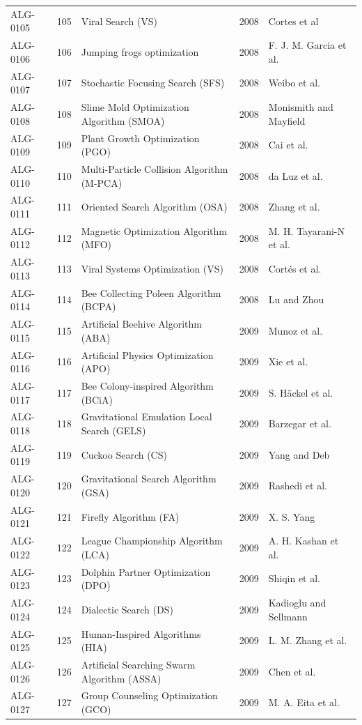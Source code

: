 \documentclass[8pt]{article}
\begin{document}
\begin{landscape}
\begin{longtable}{P{1.7cm}rP{10.0cm}rP{7.2cm}}
ALG-0105 & 105 & Viral Search (VS) & 2008 & Cortes et al \\
ALG-0106 & 106 & Jumping frogs optimization & 2008 & F. J. M. Garcia et al. \\
ALG-0107 & 107 & Stochastic Focusing Search (SFS) & 2008 & Weibo et al. \\
ALG-0108 & 108 & Slime Mold Optimization Algorithm (SMOA) & 2008 & Monismith and Mayfield \\
ALG-0109 & 109 & Plant Growth Optimization (PGO) & 2008 & Cai et al. \\
ALG-0110 & 110 & Multi-Particle Collision Algorithm (M-PCA) & 2008 & da Luz et al. \\
ALG-0111 & 111 & Oriented Search Algorithm (OSA) & 2008 & Zhang et al. \\
ALG-0112 & 112 & Magnetic Optimization Algorithm (MFO) & 2008 & M. H. Tayarani-N et al. \\
ALG-0113 & 113 & Viral Systems Optimization (VS) & 2008 & Cortés et al. \\
ALG-0114 & 114 & Bee Collecting Poleen Algorithm (BCPA) & 2008 & Lu and Zhou \\
ALG-0115 & 115 & Artificial Beehive Algorithm (ABA) & 2009 & Munoz et al. \\
ALG-0116 & 116 & Artificial Physics Optimization (APO) & 2009 & Xie et al. \\
ALG-0117 & 117 & Bee Colony-inspired Algorithm (BCiA) & 2009 & S. Häckel et al. \\
ALG-0118 & 118 & Gravitational Emulation Local Search (GELS) & 2009 & Barzegar et al. \\
ALG-0119 & 119 & Cuckoo Search (CS) & 2009 & Yang and Deb \\
ALG-0120 & 120 & Gravitational Search Algorithm (GSA) & 2009 & Rashedi et al. \\
ALG-0121 & 121 & Firefly Algorithm (FA) & 2009 & X. S. Yang \\
ALG-0122 & 122 & League Championship Algorithm (LCA) & 2009 & A. H. Kashan et al. \\
ALG-0123 & 123 & Dolphin Partner Optimization (DPO) & 2009 & Shiqin et al. \\
ALG-0124 & 124 & Dialectic Search (DS) & 2009 & Kadioglu and Sellmann \\
ALG-0125 & 125 & Human-Inspired Algorithms (HIA) & 2009 & L. M. Zhang et al. \\
ALG-0126 & 126 & Artificial Searching Swarm Algorithm (ASSA) & 2009 & Chen et al. \\
ALG-0127 & 127 & Group Counseling Optimization (GCO) & 2009 & M. A. Eita et al. \\

\end{longtable}
\end{landscape}
\end{document}
